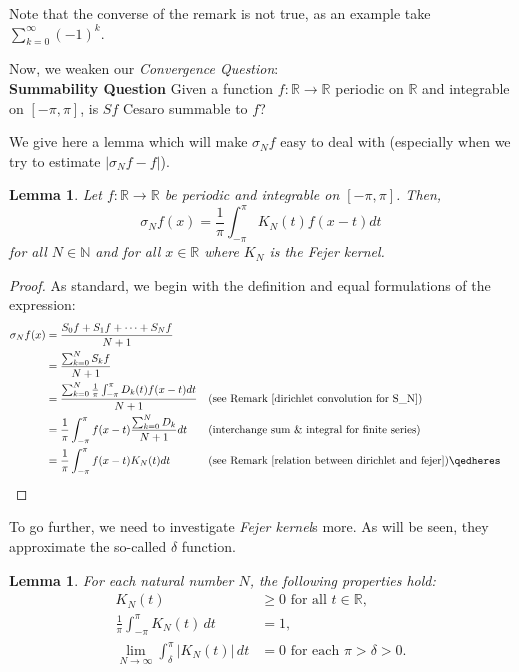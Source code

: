 \documentclass[12pt]{amsart}
\newtheorem{lemma}[theorem]{Lemma}
\theoremstyle{definition}
\begin{document}
Note that the converse of the remark is not true, as an example take $\sum_{k = 0}^{\infty} (-1) ^ k$.\par


Now, we weaken our \textit{Convergence Question}: \\


\textbf{Summability Question} Given a function $f: \mathbb{R} \xrightarrow{} \mathbb{R} $ periodic on $\mathbb{R}$ and integrable on $[-\pi, \pi]$, is $Sf$ Cesaro summable to \(f\)?\par
We give here a lemma which will make $\sigma_N f$ easy to deal with (especially when we try to estimate $|\sigma_N f - f|$).


\begin{lemma}\label{convolutio for sigma_N with K_N}
    Let $f: \mathbb{R} \xrightarrow{} \mathbb{R} $ be periodic and integrable on $[-\pi, \pi]$. Then,
    \[
    \sigma_Nf(x) = \frac{1}{\pi} \int_{-\pi}^{\pi} K_N(t)f(x-t)dt
    \]
    for all $N \in \mathbb{N}$ and for all $ x \in \mathbb{R}$ where $K_N$ is the Fejer kernel.\footnotemark{}
\end{lemma}


\begin{proof} As standard, we begin with the definition and equal formulations of the expression:
    \begin{align*}
    \sigma_Nf(x) &= \frac{S_0f + S_1f + \dots + S_Nf}{N+1}\\
                 &= \frac{\sum_{k = 0}^{N}S_kf}{N+1} \\
                 &= \frac{\sum_{k = 0}^{N}\frac{1}{\pi}\int_{-\pi}^{\pi}D_k(t)f(x-t)dt}{N+1} &&\text{(see Remark \ref{dirichlet convolution for S_N})}\\
                 &= \frac{1}{\pi}\int_{-\pi}^{\pi}f(x-t)\frac{\sum_{k = 0}^{N}D_k}{N+1}dt &&\text{(interchange sum \& integral for finite series)}\\
                 &= \frac{1}{\pi}\int_{-\pi}^{\pi}f(x-t)K_N(t)dt &&\text{(see Remark \ref{relation between dirichlet and fejer})}\qedheres
    \end{align*}
\end{proof}


\par
To go further, we need to investigate \textit{Fejer kernel}s more. As will be seen, they approximate the so-called $\delta$ function.


\begin{lemma}\label{properties of K_N}
    For each natural number $N$, the following properties hold:
    \begin{align*}
        K_N(t) &\geq 0 \text{ for all } t \in \mathbb{R}, \\
        \frac{1}{\pi}\int_{-\pi}^{\pi} K_N(t) \, dt &= 1, \\
        \lim_{N \to \infty} \int_{\delta}^{\pi} |K_N(t)| \, dt &= 0 \text{ for each $\pi > \delta > 0$.}\\ 
    \end{align*}

\end{lemma}
\end{document}
